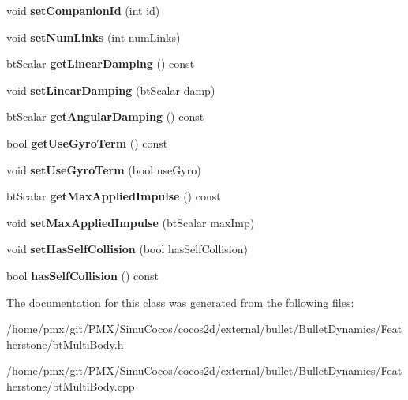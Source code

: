 \begin{DoxyCompactItemize}
void {\bfseries set\+Companion\+Id} (int id)
\item 
\mbox{\label{classbtMultiBody_ab2b5bc6f3953c9768bb6caa0aba43e63}} 
void {\bfseries set\+Num\+Links} (int num\+Links)
\item 
\mbox{\label{classbtMultiBody_abde7f2e9e334ba27c207e9341e2ea064}} 
bt\+Scalar {\bfseries get\+Linear\+Damping} () const
\item 
\mbox{\label{classbtMultiBody_a51e85f96027e3b2d6a7c87d60b3c7660}} 
void {\bfseries set\+Linear\+Damping} (bt\+Scalar damp)
\item 
\mbox{\label{classbtMultiBody_a2ccb51f59b0ffdc6b28cfcae2adb938b}} 
bt\+Scalar {\bfseries get\+Angular\+Damping} () const
\item 
\mbox{\label{classbtMultiBody_a21cb8e09cc1a6b060fc39b6335fc0a2c}} 
bool {\bfseries get\+Use\+Gyro\+Term} () const
\item 
\mbox{\label{classbtMultiBody_a2bcc1281a4e5d88d68c1caf6baa691c7}} 
void {\bfseries set\+Use\+Gyro\+Term} (bool use\+Gyro)
\item 
\mbox{\label{classbtMultiBody_aa3573138f236844e4e141039740da588}} 
bt\+Scalar {\bfseries get\+Max\+Applied\+Impulse} () const
\item 
\mbox{\label{classbtMultiBody_a0d79a9b5c5371b661b7692ee3d4a9e75}} 
void {\bfseries set\+Max\+Applied\+Impulse} (bt\+Scalar max\+Imp)
\item 
\mbox{\label{classbtMultiBody_a4c7bc3057da41bae8fa8873ea9dbb191}} 
void {\bfseries set\+Has\+Self\+Collision} (bool has\+Self\+Collision)
\item 
\mbox{\label{classbtMultiBody_a53daf4eedb691d0b4dc280147a932aa3}} 
bool {\bfseries has\+Self\+Collision} () const
\end{DoxyCompactItemize}


The documentation for this class was generated from the following files\+:\begin{DoxyCompactItemize}
\item 
/home/pmx/git/\+P\+M\+X/\+Simu\+Cocos/cocos2d/external/bullet/\+Bullet\+Dynamics/\+Featherstone/bt\+Multi\+Body.\+h\item 
/home/pmx/git/\+P\+M\+X/\+Simu\+Cocos/cocos2d/external/bullet/\+Bullet\+Dynamics/\+Featherstone/bt\+Multi\+Body.\+cpp\end{DoxyCompactItemize}

